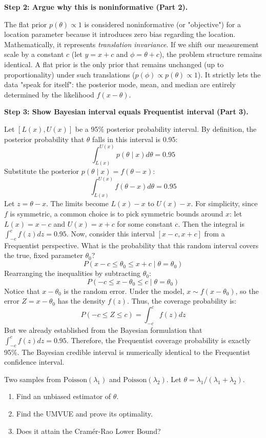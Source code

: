 \begin{solution}
\textbf{Step 2: Argue why this is noninformative (Part 2).}

The flat prior $p(\theta) \propto 1$ is considered noninformative (or "objective") for a location parameter because it introduces zero bias regarding the location.
Mathematically, it represents \textit{translation invariance}. If we shift our measurement scale by a constant $c$ (let $y = x+c$ and $\phi = \theta+c$), the problem structure remains identical. A flat prior is the only prior that remains unchanged (up to proportionality) under such translations ($p(\phi) \propto p(\theta) \propto 1$). 
It strictly lets the data "speak for itself": the posterior mode, mean, and median are entirely determined by the likelihood $f(x-\theta)$.

\textbf{Step 3: Show Bayesian interval equals Frequentist interval (Part 3).}

Let $[L(x), U(x)]$ be a 95\% posterior probability interval. By definition, the posterior probability that $\theta$ falls in this interval is 0.95:
\[ \int_{L(x)}^{U(x)} p(\theta \mid x) d\theta = 0.95 \]
Substitute the posterior $p(\theta \mid x) = f(\theta-x)$:
\[ \int_{L(x)}^{U(x)} f(\theta-x) d\theta = 0.95 \]
Let $z = \theta - x$. The limits become $L(x)-x$ to $U(x)-x$.
For simplicity, since $f$ is symmetric, a common choice is to pick symmetric bounds around $x$: let $L(x) = x - c$ and $U(x) = x + c$ for some constant $c$.
Then the integral is $\int_{-c}^{c} f(z) dz = 0.95$.
Now, consider this interval $[x-c, x+c]$ from a Frequentist perspective. What is the probability that this random interval covers the true, fixed parameter $\theta_0$?
\[ P(x-c \leq \theta_0 \leq x+c \mid \theta = \theta_0) \]
Rearranging the inequalities by subtracting $\theta_0$:
\[ P(-c \leq x - \theta_0 \leq c \mid \theta = \theta_0) \]
Notice that $x - \theta_0$ is the random error. Under the model, $x \sim f(x-\theta_0)$, so the error $Z = x-\theta_0$ has the density $f(z)$.
Thus, the coverage probability is:
\[ P(-c \leq Z \leq c) = \int_{-c}^{c} f(z) dz \]
But we already established from the Bayesian formulation that $\int_{-c}^{c} f(z) dz = 0.95$.
Therefore, the Frequentist coverage probability is exactly 95\%. The Bayesian credible interval is numerically identical to the Frequentist confidence interval.
\end{solution}

\begin{exercise}\label{probability:2011:10}
Two samples from $\text{Poisson}(\lambda_1)$ and $\text{Poisson}(\lambda_2)$. Let $\theta = \lambda_1 / (\lambda_1 + \lambda_2)$.
\begin{enumerate}
    \item Find an unbiased estimator of $\theta$.
    \item Find the UMVUE and prove its optimality.
    \item Does it attain the Cramér-Rao Lower Bound?
\end{enumerate}
\end{exercise}

